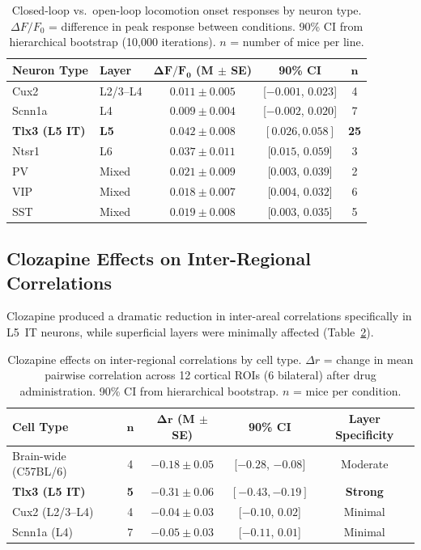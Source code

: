 \documentclass[11pt]{article}
\begin{document}
\begin{table}[H]
\centering
\caption{Closed-loop vs.\ open-loop locomotion onset responses by neuron type. $\Delta F/F_0$ = difference in peak response between conditions. 90\% CI from hierarchical bootstrap \citep{efron1979bootstrap} (10,000 iterations). $n$ = number of mice per line.}
\label{tab:closedopen}
\begin{tabular}{llccc}
\toprule
\textbf{Neuron Type} & \textbf{Layer} & $\boldsymbol{\Delta F/F_0}$ \textbf{(M $\pm$ SE)} & \textbf{90\% CI} & $\boldsymbol{n}$ \\
\midrule
Cux2 & L2/3--L4 & $0.011 \pm 0.005$ & [$-0.001$, $0.023$] & 4 \\
Scnn1a & L4 & $0.009 \pm 0.004$ & [$-0.002$, $0.020$] & 7 \\
\textbf{Tlx3 (L5 IT)} & \textbf{L5} & $\mathbf{0.042 \pm 0.008}$ & $\mathbf{[0.026, 0.058]}$ & \textbf{25} \\
Ntsr1 & L6 & $0.037 \pm 0.011$ & [$0.015$, $0.059$] & 3 \\
PV & Mixed & $0.021 \pm 0.009$ & [$0.003$, $0.039$] & 2 \\
VIP & Mixed & $0.018 \pm 0.007$ & [$0.004$, $0.032$] & 6 \\
SST & Mixed & $0.019 \pm 0.008$ & [$0.003$, $0.035$] & 5 \\
\bottomrule
\end{tabular}
\end{table}

\subsection{Clozapine Effects on Inter-Regional Correlations}

Clozapine produced a dramatic reduction in inter-areal correlations specifically in L5~IT neurons, while superficial layers were minimally affected (Table~\ref{tab:cloz_corr}).

\begin{table}[H]
\centering
\caption{Clozapine effects on inter-regional correlations by cell type. $\Delta r$ = change in mean pairwise correlation across 12 cortical ROIs (6 bilateral) after drug administration. 90\% CI from hierarchical bootstrap. $n$ = mice per condition.}
\label{tab:cloz_corr}
\begin{tabular}{lcccc}
\toprule
\textbf{Cell Type} & $\boldsymbol{n}$ & $\boldsymbol{\Delta r}$ \textbf{(M $\pm$ SE)} & \textbf{90\% CI} & \textbf{Layer Specificity} \\
\midrule
Brain-wide (C57BL/6) & 4 & $-0.18 \pm 0.05$ & [$-0.28$, $-0.08$] & Moderate \\
\textbf{Tlx3 (L5 IT)} & \textbf{5} & $\mathbf{-0.31 \pm 0.06}$ & $\mathbf{[-0.43, -0.19]}$ & \textbf{Strong} \\
Cux2 (L2/3--L4) & 4 & $-0.04 \pm 0.03$ & [$-0.10$, $0.02$] & Minimal \\
Scnn1a (L4) & 7 & $-0.05 \pm 0.03$ & [$-0.11$, $0.01$] & Minimal \\
\bottomrule
\end{tabular}
\end{table}
\end{document}
